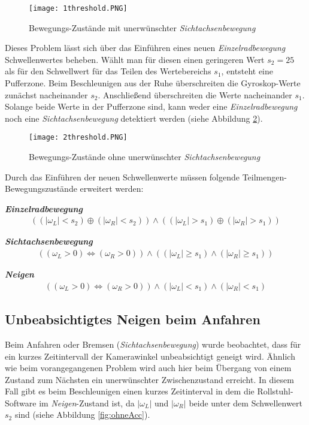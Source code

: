 \begin{figure}[h]
    \centering
    \texttt{[image: 1threshold.PNG]}
    \caption{Bewegungs-Zustände mit unerwünschter \textit{Sichtachsenbewegung}}
    \label{fig:1_threshold}
\end{figure}

Dieses Problem lässt sich über das Einführen eines neuen \textit{Einzelradbewegung} Schwellenwertes beheben.
Wählt man für diesen einen geringeren Wert $s_2 = 25$ als für den Schwellwert für das Teilen des Wertebereichs $s_1$, entsteht eine Pufferzone.
Beim Beschleunigen aus der Ruhe überschreiten die Gyroskop-Werte zunächst nacheinander $s_2$. Anschließend überschreiten die Werte nacheinander $s_1$.
Solange beide Werte in der Pufferzone sind, kann weder eine \textit{Einzelradbewegung} noch eine \textit{Sichtachsenbewegung} detektiert werden (siehe Abbildung \ref{fig:2_threshold}).

\begin{figure}[h]
    \centering
    \texttt{[image: 2threshold.PNG]}
    \caption{Bewegungs-Zustände ohne unerwünschter \textit{Sichtachsenbewegung}}
    \label{fig:2_threshold}
\end{figure}

Durch das Einführen der neuen Schwellenwerte müssen folgende Teilmengen-Bewegungszustände erweitert werden:

\textbf{\textit{Einzelradbewegung}}
\begin{align}
    ((|\omega_L| < s_2) \oplus (|\omega_R| < s_2)) \land ((|\omega_L| > s_1) \oplus (|\omega_R| > s_1))
\end{align}

\textbf{\textit{Sichtachsenbewegung}}
\begin{align}
    ((\omega_L > 0) \Leftrightarrow (\omega_R > 0)) \land ((|\omega_L| \geq s_1) \land (|\omega_R| \geq s_1))
\end{align}

\textbf{\textit{Neigen}}
\begin{align}
    ((\omega_L > 0) \Leftrightarrow (\omega_R > 0)) \land (|\omega_L| < s_1) \land (|\omega_R| < s_1)
\end{align}

\subsection{Unbeabsichtigtes Neigen beim Anfahren}
Beim Anfahren oder Bremsen (\textit{Sichtachsenbewegung}) wurde beobachtet, dass für ein kurzes Zeitintervall der Kamerawinkel unbeabsichtigt geneigt wird.
Ähnlich wie beim vorangegangenen Problem wird auch hier beim Übergang von einem Zustand zum Nächsten ein unerwünschter Zwischenzustand erreicht.
In diesem Fall gibt es beim Beschleunigen einen kurzes Zeitinterval in dem die Rollstuhl-Software im \textit{Neigen}-Zustand ist, da $|\omega_L|$ und $|\omega_R|$ beide unter dem Schwellenwert $s_2$ sind (siehe Abbildung \ref{fig:ohneAcc}).

